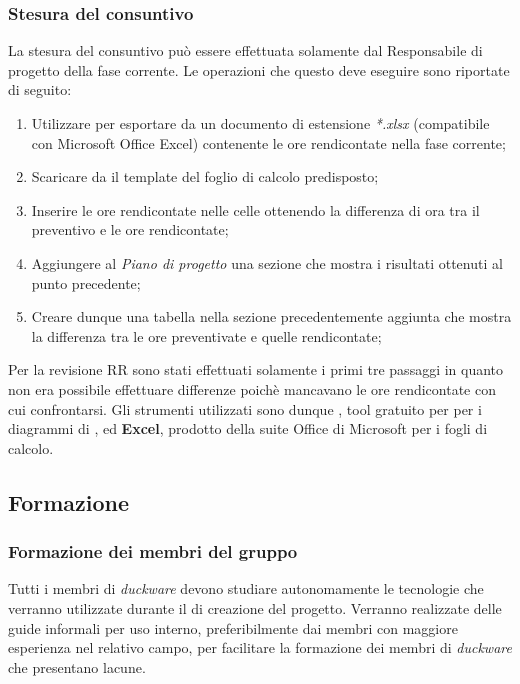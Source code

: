 \subsubsection{Stesura del consuntivo}
La stesura del consuntivo può essere effettuata solamente dal Responsabile di progetto della fase corrente. Le operazioni che questo deve eseguire sono riportate di seguito:

\begin{enumerate}
    \item Utilizzare  per esportare da  un documento di estensione \textit{*.xlsx} (compatibile con Microsoft Office Excel) contenente le ore rendicontate nella fase corrente;
    \item Scaricare da  il template del foglio di calcolo predisposto;
    \item Inserire le ore rendicontate nelle celle ottenendo la differenza di ora tra il preventivo e le ore rendicontate;
    \item Aggiungere al \textit{Piano di progetto} una sezione che mostra i risultati ottenuti al punto precedente;
    \item Creare dunque una tabella nella sezione precedentemente aggiunta che mostra la differenza tra le ore preventivate e quelle rendicontate;
\end{enumerate}

Per la revisione RR sono stati effettuati solamente i primi tre passaggi in quanto non era possibile effettuare differenze poichè mancavano le ore rendicontate con cui confrontarsi. Gli strumenti utilizzati sono dunque \textbf{}, tool gratuito per  per i diagrammi di , ed \textbf{Excel}, prodotto della suite Office di Microsoft per i fogli di calcolo.

\subsection{Formazione}
\label{sec:formazione}
\subsubsection{Formazione dei membri del gruppo}
Tutti i membri di \emph{duckware} devono studiare autonomamente le tecnologie che verranno utilizzate durante il  di creazione del progetto. Verranno realizzate delle guide informali per uso interno, preferibilmente dai membri con maggiore esperienza nel relativo campo, per facilitare la formazione dei membri di \emph{duckware} che presentano lacune.

